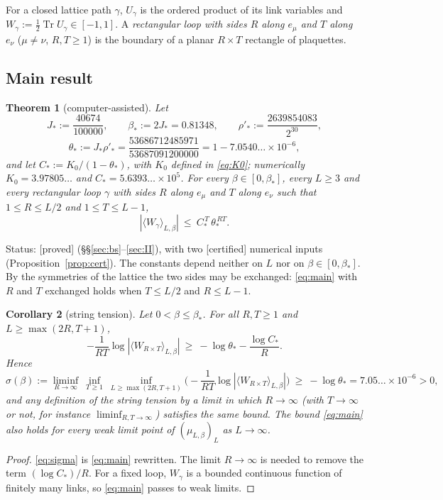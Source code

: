 \documentclass[11pt,a4paper]{article}
\theoremstyle{plain}
\newtheorem{theorem}{Theorem}[section]
\newtheorem{corollary}[theorem]{Corollary}
\theoremstyle{remark}
\numberwithin{equation}{section}
\newcommand{\Tr}{\operatorname{Tr}}
\newcommand{\st}[1]{\textsf{[#1]}}
\begin{document}
For a closed lattice path $\gamma$, $U_\gamma$ is the ordered product of its link variables and $W_\gamma:=\frac12\Tr U_\gamma\in
[-1,1]$. A \emph{rectangular loop with sides $R$ along $e_\mu$ and $T$ along $e_\nu$} ($\mu\ne\nu$, $R,T\ge1$) is the boundary of a
planar $R\times T$ rectangle of plaquettes.

\subsection{Main result}

\begin{theorem}[computer-assisted]\label{thm:main}
Let
\[
J_*:=\frac{40674}{100000},\qquad \beta_*:=2J_*=0.81348,\qquad \rho'_*:=\frac{2639854083}{2^{30}},
\]
\[
\theta_*:=J_*\rho'_*=\frac{53686712485971}{53687091200000}=1-7.0540\ldots\times10^{-6},
\]
and let $C_*:=K_0/(1-\theta_*)$, with $K_0$ defined in \eqref{eq:K0}; numerically $K_0=3.97805\ldots$ and
$C_*=5.6393\ldots\times10^{5}$. For every $\beta\in[0,\beta_*]$, every $L\ge3$ and every rectangular loop $\gamma$ with sides $R$
along $e_\mu$ and $T$ along $e_\nu$ such that $1\le R\le L/2$ and $1\le T\le L-1$,
\begin{equation}\label{eq:main}
|\langle W_\gamma\rangle_{L,\beta}|\ \le\ C_*^{\,T}\,\theta_*^{\,RT}.
\end{equation}
\end{theorem}
\noindent Status: \st{proved} (\S\S\ref{sec:bs}--\ref{sec:II}), with two \st{certified} numerical inputs
(Proposition~\ref{prop:cert}). The constants depend neither on $L$ nor on $\beta\in[0,\beta_*]$. By the symmetries of the lattice the
two sides may be exchanged: \eqref{eq:main} with $R$ and $T$ exchanged holds when $T\le L/2$ and $R\le L-1$.

\begin{corollary}[string tension]\label{cor:tension}
Let $0<\beta\le\beta_*$. For all $R,T\ge1$ and $L\ge\max(2R,T+1)$,
\begin{equation}\label{eq:sigma}
-\frac1{RT}\log|\langle W_{R\times T}\rangle_{L,\beta}|\ \ge\ -\log\theta_*-\frac{\log C_*}{R}.
\end{equation}
Hence
\[
\sigma(\beta):=\liminf_{R\to\infty}\ \inf_{T\ge1}\ \inf_{L\ge\max(2R,T+1)}\Big(-\frac1{RT}\log|\langle W_{R\times T}\rangle_{L,\beta}|
\Big)\ \ge\ -\log\theta_*=7.05\ldots\times10^{-6}>0,
\]
and any definition of the string tension by a limit in which $R\to\infty$ (with $T\to\infty$
or not, for instance $\liminf_{R,T\to\infty}$) satisfies the same bound. The bound \eqref{eq:main} also holds for every weak limit point of $(\mu_{L,\beta})_{L}$ as
$L\to\infty$.
\end{corollary}
\begin{proof}
\eqref{eq:sigma} is \eqref{eq:main} rewritten. The limit $R\to\infty$ is needed to remove the term $(\log C_*)/R$. For a fixed loop,
$W_\gamma$ is a bounded continuous function of finitely many links, so \eqref{eq:main} passes to weak limits.
\end{proof}
\end{document}
